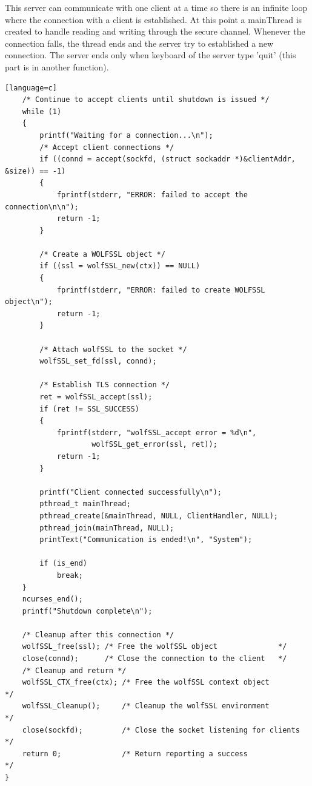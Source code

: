 \documentclass[a4paper,12pt]{report}
\begin{document}
This server can communicate with one client at a time so there is an infinite loop where the connection with a client is established. At this point a mainThread is created to handle reading and writing through the secure channel. Whenever the connection falls, the thread ends and the server try to established a new connection. The server ends only when keyboard of the server type 'quit' (this part is in another function).
\begin{lstlisting}[caption={int main() of SSL server, 2* part},captionpos=b][language=c]
    /* Continue to accept clients until shutdown is issued */
    while (1)
    {
	    printf("Waiting for a connection...\n");
        /* Accept client connections */
        if ((connd = accept(sockfd, (struct sockaddr *)&clientAddr, &size)) == -1)
        {
            fprintf(stderr, "ERROR: failed to accept the connection\n\n");
            return -1;
        }

        /* Create a WOLFSSL object */
        if ((ssl = wolfSSL_new(ctx)) == NULL)
        {
            fprintf(stderr, "ERROR: failed to create WOLFSSL object\n");
            return -1;
        }

        /* Attach wolfSSL to the socket */
        wolfSSL_set_fd(ssl, connd);

        /* Establish TLS connection */
        ret = wolfSSL_accept(ssl);
        if (ret != SSL_SUCCESS)
        {
            fprintf(stderr, "wolfSSL_accept error = %d\n",
                    wolfSSL_get_error(ssl, ret));
            return -1;
        }

        printf("Client connected successfully\n");
        pthread_t mainThread;
        pthread_create(&mainThread, NULL, ClientHandler, NULL);
        pthread_join(mainThread, NULL);
        printText("Communication is ended!\n", "System");

        if (is_end)
            break;
    }
    ncurses_end();
    printf("Shutdown complete\n");

    /* Cleanup after this connection */
    wolfSSL_free(ssl); /* Free the wolfSSL object              */
    close(connd);      /* Close the connection to the client   */
    /* Cleanup and return */
    wolfSSL_CTX_free(ctx); /* Free the wolfSSL context object          */
    wolfSSL_Cleanup();     /* Cleanup the wolfSSL environment          */
    close(sockfd);         /* Close the socket listening for clients   */
    return 0;              /* Return reporting a success               */
}
\end{lstlisting}
\end{document}
